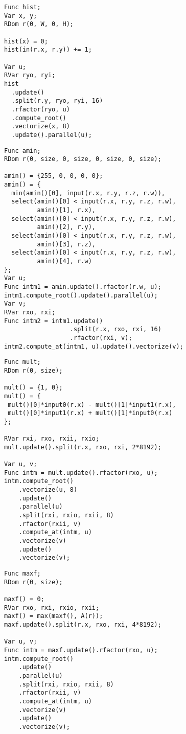 
\begin{lstlisting}[caption={Benchmark code for histogram of a two-dimensional image.}, label={lst:benchmark_histogram}]
Func hist;
Var x, y;
RDom r(0, W, 0, H);

hist(x) = 0;
hist(in(r.x, r.y)) += 1;

Var u;
RVar ryo, ryi;
hist
  .update()
  .split(r.y, ryo, ryi, 16)
  .rfactor(ryo, u)
  .compute_root()
  .vectorize(x, 8)
  .update().parallel(u);
\end{lstlisting}

\begin{lstlisting}[caption={Benchmark code for argmin over 4D array}, label={lst:benchmark_argmin}]
Func amin;
RDom r(0, size, 0, size, 0, size, 0, size);

amin() = {255, 0, 0, 0, 0};
amin() = {
  min(amin()[0], input(r.x, r.y, r.z, r.w)),
  select(amin()[0] < input(r.x, r.y, r.z, r.w), 
         amin()[1], r.x),
  select(amin()[0] < input(r.x, r.y, r.z, r.w), 
         amin()[2], r.y),
  select(amin()[0] < input(r.x, r.y, r.z, r.w), 
         amin()[3], r.z),
  select(amin()[0] < input(r.x, r.y, r.z, r.w), 
         amin()[4], r.w)
};
Var u;
Func intm1 = amin.update().rfactor(r.w, u);
intm1.compute_root().update().parallel(u);
Var v;
RVar rxo, rxi;
Func intm2 = intm1.update()
                  .split(r.x, rxo, rxi, 16)
                  .rfactor(rxi, v);
intm2.compute_at(intm1, u).update().vectorize(v);                   
\end{lstlisting}

\begin{lstlisting}[caption={Benchmark code for complex product}, label={lst:benchmark_complex_multiply}]
Func mult;
RDom r(0, size);

mult() = {1, 0};
mult() = {
 mult()[0]*input0(r.x) - mult()[1]*input1(r.x),
 mult()[0]*input1(r.x) + mult()[1]*input0(r.x)
};

RVar rxi, rxo, rxii, rxio;
mult.update().split(r.x, rxo, rxi, 2*8192);

Var u, v;
Func intm = mult.update().rfactor(rxo, u);
intm.compute_root()
    .vectorize(u, 8)
    .update()
    .parallel(u)
    .split(rxi, rxio, rxii, 8)
    .rfactor(rxii, v)
    .compute_at(intm, u)
    .vectorize(v)
    .update()
    .vectorize(v);
\end{lstlisting}

\begin{lstlisting}[caption={Benchmark code for finding the maximum value over 1D array}, label={lst:benchmark_max}]
Func maxf;
RDom r(0, size);

maxf() = 0;
RVar rxo, rxi, rxio, rxii;
maxf() = max(maxf(), A(r));
maxf.update().split(r.x, rxo, rxi, 4*8192);

Var u, v;
Func intm = maxf.update().rfactor(rxo, u);
intm.compute_root()
    .update()
    .parallel(u)
    .split(rxi, rxio, rxii, 8)
    .rfactor(rxii, v)
    .compute_at(intm, u)
    .vectorize(v)
    .update()
    .vectorize(v);
\end{lstlisting}

